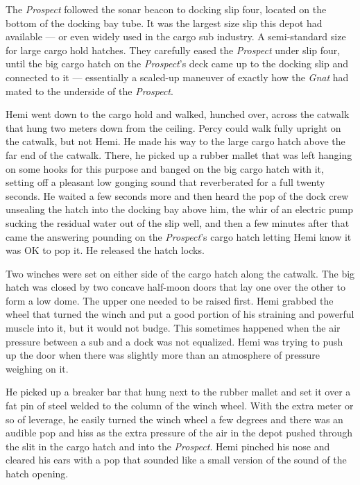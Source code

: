 \documentclass[
]{scrbook}
\begin{document}
The \emph{Prospect} followed the sonar beacon to docking slip four,
located on the bottom of the docking bay tube. It was the largest size
slip this depot had available --- or even widely used in the cargo sub
industry. A semi-standard size for large cargo hold hatches. They
carefully eased the \emph{Prospect} under slip four, until the big cargo
hatch on the \emph{Prospect}'s deck came up to the docking slip and
connected to it --- essentially a scaled-up maneuver of exactly how the
\emph{Gnat} had mated to the underside of the \emph{Prospect}.

Hemi went down to the cargo hold and walked, hunched over, across the
catwalk that hung two meters down from the ceiling. Percy could walk
fully upright on the catwalk, but not Hemi. He made his way to the large
cargo hatch above the far end of the catwalk. There, he picked up a
rubber mallet that was left hanging on some hooks for this purpose and
banged on the big cargo hatch with it, setting off a pleasant low
gonging sound that reverberated for a full twenty seconds. He waited a
few seconds more and then heard the pop of the dock crew unsealing the
hatch into the docking bay above him, the whir of an electric pump
sucking the residual water out of the slip well, and then a few minutes
after that came the answering pounding on the \emph{Prospect}'s cargo
hatch letting Hemi know it was OK to pop it. He released the hatch
locks.

Two winches were set on either side of the cargo hatch along the
catwalk. The big hatch was closed by two concave half-moon doors that
lay one over the other to form a low dome. The upper one needed to be
raised first. Hemi grabbed the wheel that turned the winch and put a
good portion of his straining and powerful muscle into it, but it would
not budge. This sometimes happened when the air pressure between a sub
and a dock was not equalized. Hemi was trying to push up the door when
there was slightly more than an atmosphere of pressure weighing on it.

He picked up a breaker bar that hung next to the rubber mallet and set
it over a fat pin of steel welded to the column of the winch wheel. With
the extra meter or so of leverage, he easily turned the winch wheel a
few degrees and there was an audible pop and hiss as the extra pressure
of the air in the depot pushed through the slit in the cargo hatch and
into the \emph{Prospect}. Hemi pinched his nose and cleared his ears
with a pop that sounded like a small version of the sound of the hatch
opening.
\end{document}
